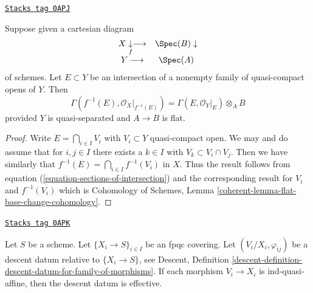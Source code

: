 \begin{lemma}
\label{more-groupoids-lemma-affine-base-change}
\href{https://stacks.math.columbia.edu/tag/0APJ}{\texttt{Stacks tag 0APJ}}

Suppose given a cartesian diagram
$$
\begin{array}{cc}X \underset{f}{\downarrow}\longrightarrow & \Spec(B) \downarrow \\ Y \longrightarrow & \Spec(A)\end{array}
$$
of schemes. Let $E \subset Y$ be an intersection of a nonempty family
of quasi-compact opens of $Y$. Then
$$
\Gamma(f^{-1}(E), \mathcal{O}_X|_{f^{-1}(E)}) =
\Gamma(E, \mathcal{O}_Y|_E) \otimes_A B
$$
provided $Y$ is quasi-separated and $A \to B$ is flat.
\end{lemma}

\begin{proof}
Write $E = \bigcap_{i \in I} V_i$ with $V_i \subset Y$ quasi-compact open.
We may and do assume that for $i, j \in I$ there exists a $k \in I$ with
$V_k \subset V_i \cap V_j$. Then we have similarly that
$f^{-1}(E) = \bigcap_{i \in I} f^{-1}(V_i)$ in $X$.
Thus the result follows from equation (\ref{equation-sections-of-intersection})
and the corresponding result for $V_i$ and $f^{-1}(V_i)$ which is
Cohomology of Schemes, Lemma \ref{coherent-lemma-flat-base-change-cohomology}.
\end{proof}

\begin{lemma}[Gabber]

\label{more-groupoids-lemma-ind-quasi-affine}
\href{https://stacks.math.columbia.edu/tag/0APK}{\texttt{Stacks tag 0APK}}

Let $S$ be a scheme. Let $\{X_i \to S\}_{i\in I}$ be an fpqc covering.
Let $(V_i/X_i, \varphi_{ij})$ be a descent datum relative to
$\{X_i \to S\}$, see Descent, Definition
\ref{descent-definition-descent-datum-for-family-of-morphisms}.
If each morphism $V_i \to X_i$ is ind-quasi-affine, then the descent datum
is effective.
\end{lemma}

